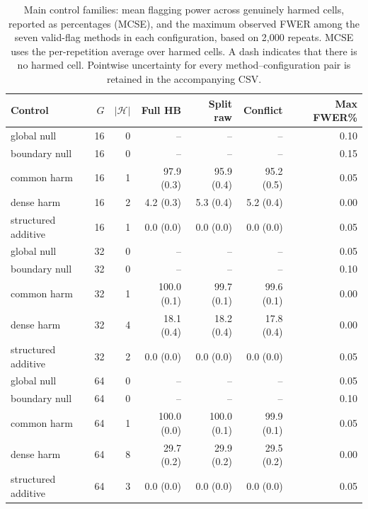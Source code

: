 \begin{table}[t]
\centering\small
\caption{Main control families: mean flagging power across genuinely harmed cells, reported as percentages (MCSE), and the maximum observed FWER among the seven valid-flag methods in each configuration, based on 2,000 repeats. MCSE uses the per-repetition average over harmed cells. A dash indicates that there is no harmed cell. Pointwise uncertainty for every method--configuration pair is retained in the accompanying CSV.}\label{tab:controls}
\begin{tabular}{lrrrrrr}
\toprule
Control & $G$ & $|\mathcal H|$ & Full HB & Split raw & Conflict & Max FWER\% \\
\midrule
global null & 16 & 0 & -- & -- & -- & 0.10 \\
boundary null & 16 & 0 & -- & -- & -- & 0.15 \\
common harm & 16 & 1 & 97.9 (0.3) & 95.9 (0.4) & 95.2 (0.5) & 0.05 \\
dense harm & 16 & 2 & 4.2 (0.3) & 5.3 (0.4) & 5.2 (0.4) & 0.00 \\
structured additive & 16 & 1 & 0.0 (0.0) & 0.0 (0.0) & 0.0 (0.0) & 0.05 \\
global null & 32 & 0 & -- & -- & -- & 0.05 \\
boundary null & 32 & 0 & -- & -- & -- & 0.10 \\
common harm & 32 & 1 & 100.0 (0.1) & 99.7 (0.1) & 99.6 (0.1) & 0.00 \\
dense harm & 32 & 4 & 18.1 (0.4) & 18.2 (0.4) & 17.8 (0.4) & 0.00 \\
structured additive & 32 & 2 & 0.0 (0.0) & 0.0 (0.0) & 0.0 (0.0) & 0.05 \\
global null & 64 & 0 & -- & -- & -- & 0.05 \\
boundary null & 64 & 0 & -- & -- & -- & 0.10 \\
common harm & 64 & 1 & 100.0 (0.0) & 100.0 (0.1) & 99.9 (0.1) & 0.05 \\
dense harm & 64 & 8 & 29.7 (0.2) & 29.9 (0.2) & 29.5 (0.2) & 0.00 \\
structured additive & 64 & 3 & 0.0 (0.0) & 0.0 (0.0) & 0.0 (0.0) & 0.05 \\
\bottomrule
\end{tabular}
\end{table}
